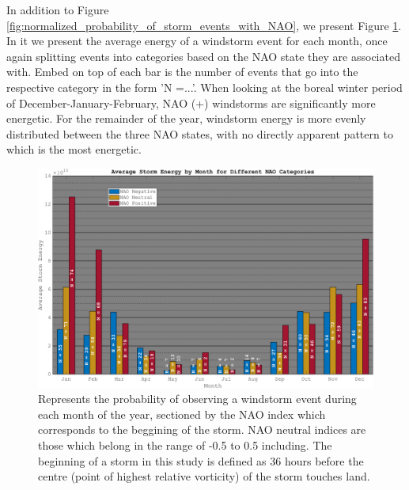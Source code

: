     In addition to Figure \ref{fig:normalized_probability_of_storm_events_with_NAO}, we present Figure \ref{fig:averageEnergyPerMonth}. In it we present the average energy of a windstorm event for each month, once again splitting events into categories based on the NAO state they are associated with. Embed on top of each bar is the number of events that go into the respective category in the form 'N =...'. When looking at the boreal winter period of December-January-February, NAO (+) windstorms are significantly more energetic. For the remainder of the year, windstorm energy is more evenly distributed between the three NAO states, with no directly apparent pattern to which is the most energetic.

        \begin{figure}
            \centering
            \includegraphics[width=\textwidth]{figures/average_storm_energy_by_month_with_nao_separated.png}
            \caption{Represents the probability of observing a windstorm event during each month of the year, sectioned by the NAO index which corresponds to the beggining of the storm. NAO neutral indices are those which belong in the range of -0.5 to 0.5 including. The beginning of a storm in this study is defined as 36 hours before the centre (point of highest relative vorticity) of the storm touches land.}
            \label{fig:averageEnergyPerMonth}
        \end{figure}



